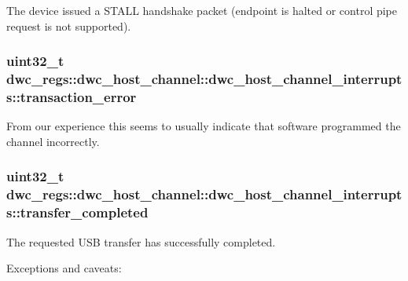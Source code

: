 The device issued a S\-T\-A\-L\-L handshake packet (endpoint is halted or control pipe request is not supported). \hypertarget{uniondwc__regs_1_1dwc__host__channel_1_1dwc__host__channel__interrupts_ab36c54d540d80b8f74daa75eb6083045}{
\subsubsection[{transaction\-\_\-error}]{\setlength{\rightskip}{0pt plus 5cm}uint32\-\_\-t dwc\-\_\-regs\-::dwc\-\_\-host\-\_\-channel\-::dwc\-\_\-host\-\_\-channel\-\_\-interrupts\-::transaction\-\_\-error}}\label{uniondwc__regs_1_1dwc__host__channel_1_1dwc__host__channel__interrupts_ab36c54d540d80b8f74daa75eb6083045}
From our experience this seems to usually indicate that software programmed the channel incorrectly. \hypertarget{uniondwc__regs_1_1dwc__host__channel_1_1dwc__host__channel__interrupts_a080f3a3c1d88ca4d75523795393a12c3}{
\subsubsection[{transfer\-\_\-completed}]{\setlength{\rightskip}{0pt plus 5cm}uint32\-\_\-t dwc\-\_\-regs\-::dwc\-\_\-host\-\_\-channel\-::dwc\-\_\-host\-\_\-channel\-\_\-interrupts\-::transfer\-\_\-completed}}\label{uniondwc__regs_1_1dwc__host__channel_1_1dwc__host__channel__interrupts_a080f3a3c1d88ca4d75523795393a12c3}
The requested U\-S\-B transfer has successfully completed.

Exceptions and caveats\-:


